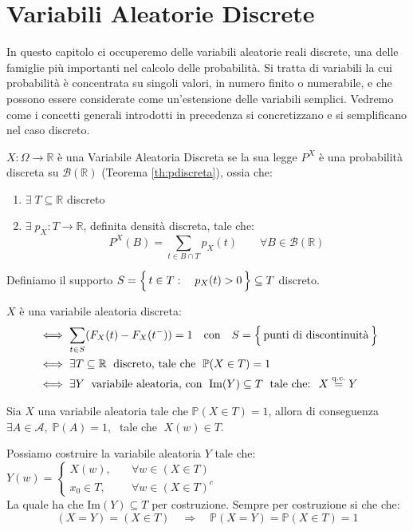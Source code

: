 \chapter{Variabili Aleatorie Discrete}

In questo capitolo ci occuperemo delle variabili aleatorie reali discrete, una delle famiglie più importanti nel calcolo delle probabilità.  
Si tratta di variabili la cui probabilità è concentrata su singoli valori, in numero finito o numerabile, e che possono essere considerate come un'estensione delle variabili semplici.  
Vedremo come i concetti generali introdotti in precedenza si concretizzano e si semplificano nel caso discreto.


\begin{definizione}
    $X:\Omega\to\mathbb{R}$ è una Variabile Aleatoria Discreta se la sua legge $P^X$ è una probabilità discreta su $\mathcal{B}(\mathbb{R})$ (Teorema \ref{th:pdiscreta}), ossia che:
    \begin{enumerate}
        \item $\exists \;T\subseteq\mathbb{R}$ discreto
        \item $\exists \; p_X:T\rightarrow\mathbb{R}$, definita densità discreta, tale che: 
        \[P^X(B) = \sum_{t\in B\cap T}p_X(t)\qquad \forall B\in \mathcal{B}(\mathbb{R})\]
    \end{enumerate}
    Definiamo il supporto $S = \Bigl\{\,t\in T:\quad p_X(t)>0\,\Bigr\}\subseteq T$ discreto.
\end{definizione}
\begin{definizione}
    $X$ è una variabile aleatoria discreta: 
    \begin{align*}
        &\iff \sum_{t\in S}(F_X(t)-F_X(t^-)) = 1 \quad \text{con}\quad S = \Bigl\{\,\text{punti di discontinuità}\,\Bigr\}\\
        &\iff \exists T\subseteq\mathbb{R}\; \text{ discreto, tale che }\; \mathbb{P}(X\in T) = 1\\
        &\iff \exists Y \;\text{ variabile aleatoria, con }\; \text{Im}(Y) \subseteq T \; \text{ tale che: }\; X\overset{\text{q.c.}}{=} Y
    \end{align*}
\end{definizione}

\begin{esempio}
    Sia $X$ una variabile aleatoria tale che $\mathbb{P}(X\in T) = 1$, allora di conseguenza $\exists A\in\mathcal{A}, \;\mathbb{P}(A) = 1, \;$ tale che $\;X(w) \in T$.

    \medskip
    \noindent Possiamo costruire la variabile aleatoria $Y$ tale che: $Y(w) = \begin{cases}
        X(w),\quad&\forall w\in(X\in T)\\
        x_0\in T, &\forall w\in(X\in T)^c
    \end{cases}$\\
    La quale ha che Im$(Y)\subseteq T$ per costruzione. Sempre per costruzione si che che:
    \[(X=Y) = (X\in T) \quad\Rightarrow\quad \mathbb{P}(X=Y) = \mathbb{P}(X\in T) = 1\]
\end{esempio}

